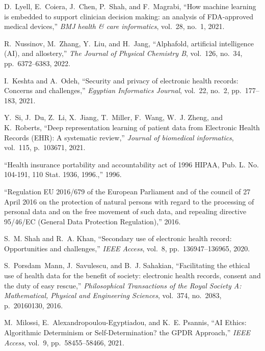 \documentclass{article}
\begin{document}
\begin{thebibliography}{100}
	D.~Lyell, E.~Coiera, J.~Chen, P.~Shah, and F.~Magrabi, ``How machine learning
	is embedded to support clinician decision making: an analysis of
	{FDA}-approved medical devices,'' {\em BMJ health \& care informatics},
	vol.~28, no.~1, 2021.
	
	R.~Nussinov, M.~Zhang, Y.~Liu, and H.~Jang, ``Alphafold, artificial
	intelligence ({AI}), and allostery,'' {\em The Journal of Physical Chemistry
		B}, vol.~126, no.~34, pp.~6372--6383, 2022.
	
	I.~Keshta and A.~Odeh, ``Security and privacy of electronic health records:
	Concerns and challenges,'' {\em Egyptian Informatics Journal}, vol.~22,
	no.~2, pp.~177--183, 2021.
	
	Y.~Si, J.~Du, Z.~Li, X.~Jiang, T.~Miller, F.~Wang, W.~J. Zheng, and K.~Roberts,
	``Deep representation learning of patient data from {E}lectronic {H}ealth
	{R}ecords ({EHR}): A systematic review,'' {\em Journal of biomedical
		informatics}, vol.~115, p.~103671, 2021.
	
	``Health insurance portability and accountability act of 1996 {HIPAA}, {P}ub.
	{L}. {N}o. 104-191, 110 {S}tat. 1936, 1996.,'' 1996.
	
	``Regulation {EU} 2016/679 of the {E}uropean {P}arliament and of the council of
	27 {A}pril 2016 on the protection of natural persons with regard to the
	processing of personal data and on the free movement of such data, and
	repealing directive 95/46/{EC} ({G}eneral {D}ata {P}rotection
	{R}egulation),'' 2016.
	
	S.~M. Shah and R.~A. Khan, ``Secondary use of electronic health record:
	Opportunities and challenges,'' {\em IEEE Access}, vol.~8,
	pp.~136947--136965, 2020.
	
	S.~Porsdam~Mann, J.~Savulescu, and B.~J. Sahakian, ``Facilitating the ethical
	use of health data for the benefit of society: electronic health records,
	consent and the duty of easy rescue,'' {\em Philosophical Transactions of the
		Royal Society A: Mathematical, Physical and Engineering Sciences}, vol.~374,
	no.~2083, p.~20160130, 2016.
	
	M.~Milossi, E.~Alexandropoulou-Egyptiadou, and K.~E. Psannis, ``{AI} {E}thics:
	{A}lgorithmic {D}eterminism or {S}elf-{D}etermination? the {GPDR}
	{A}pproach,'' {\em IEEE Access}, vol.~9, pp.~58455--58466, 2021.
	

\end{thebibliography}
\end{document}
